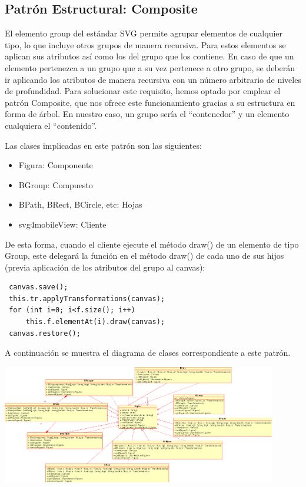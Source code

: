 \documentclass[a4paper,10pt]{article}
\begin{document}
\subsection{Patrón Estructural: Composite}

El elemento group del estándar SVG permite agrupar elementos de cualquier tipo, lo que incluye otros grupos de manera recursiva. Para estos elementos se aplican sus atributos así como los del grupo que los contiene. En caso de que un elemento pertenezca a un grupo que a su vez pertenece a otro grupo, se deberán ir aplicando los atributos de manera recursiva con un número arbitrario de niveles de profundidad. Para solucionar este requisito, hemos optado por emplear el patrón Composite, que nos ofrece este funcionamiento gracias a su estructura en forma de árbol. En nuestro caso, un grupo sería el ``contenedor'' y un elemento cualquiera el ``contenido''.

Las clases implicadas en este patrón son las siguientes:
\begin{itemize}
\item Figura: Componente
\item BGroup: Compuesto
\item BPath, BRect, BCircle, etc: Hojas
\item svg4mobileView: Cliente
\end{itemize}

De esta forma, cuando el cliente ejecute el método draw() de un elemento de tipo Group, este delegará la función en el método draw() de cada uno de sus hijos (previa aplicación de los atributos del grupo al canvas):

\begin{verbatim}
 canvas.save();
 this.tr.applyTransformations(canvas);
 for (int i=0; i<f.size(); i++)
     this.f.elementAt(i).draw(canvas);
 canvas.restore();
\end{verbatim}

A continuación se muestra el diagrama de clases correspondiente a este patrón.

\begin{center}
 \includegraphics[width=12cm]{texres/composite.png}
\end{center}
\end{document}
